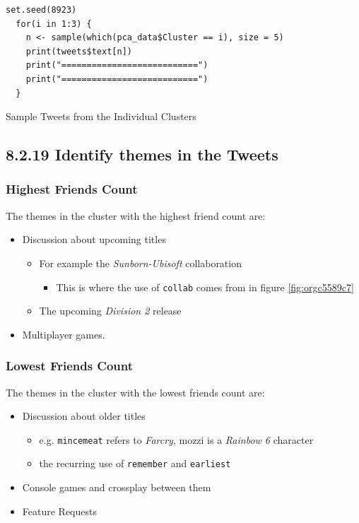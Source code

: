 \documentclass[11pt]{article}
\begin{document}
\begin{listing}[htbp]
\begin{verbatim}
set.seed(8923)
  for(i in 1:3) {
    n <- sample(which(pca_data$Cluster == i), size = 5)
    print(tweets$text[n])
    print("===========================")
    print("===========================")
  }
\end{verbatim}
\caption{\label{org3e0a0c7}Sample Tweets from the Individual Clusters}
\end{listing}

\subsection{8.2.19 Identify themes in the Tweets}
\label{sec:org96fbd23}
\subsubsection{Highest Friends Count}
\label{sec:orgc2e6e71}
The themes in the cluster with the highest friend count are:

\begin{itemize}
\item Discussion about upcoming titles
\begin{itemize}
\item For example the \emph{Sunborn-Ubisoft} collaboration
\begin{itemize}
\item This is where the use of \texttt{collab} comes from in figure \ref{fig:orgc5589c7}
\end{itemize}
\item The upcoming \emph{Division 2} release
\end{itemize}
\item Multiplayer games.
\end{itemize}
\subsubsection{Lowest Friends Count}
\label{sec:org064950f}

The themes in the cluster with the lowest friends count are:

\begin{itemize}
\item Discussion about older titles
\begin{itemize}
\item e.g. \texttt{mincemeat} refers to \emph{Farcry}, mozzi is a \emph{Rainbow 6} character
\item the recurring use of \texttt{remember} and \texttt{earliest}
\end{itemize}
\item Console games and crossplay between them
\item Feature Requests
\end{itemize}
\end{document}
